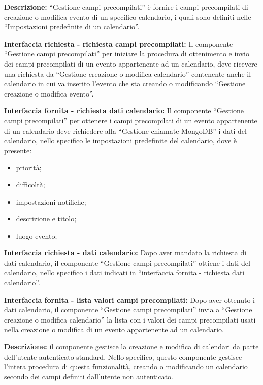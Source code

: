 \begin{listaPersonale}[]{}

    \textbf{Descrizione:}  “Gestione campi precompilati” è fornire i campi precompilati di creazione o modifica evento di un specifico calendario, i quali sono definiti nelle “Impostazioni predefinite di un calendario”.

    \textbf{Interfaccia richiesta - richiesta campi precompilati:} Il componente “Gestione campi precompilati” per iniziare la procedura di ottenimento e invio dei campi precompilati di un evento appartenente ad un calendario, deve ricevere una richiesta da “Gestione creazione o modifica calendario” contenente anche il calendario in cui va inserito l'evento che sta creando o modificando “Gestione creazione o modifica evento”.

    \textbf{Interfaccia fornita - richiesta dati calendario:} Il componente “Gestione campi precompilati” per ottenere i campi precompilati di un evento appartenente di un calendario deve richiedere alla “Gestione chiamate MongoDB” i dati del calendario, nello specifico le impostazioni predefinite del calendario, dove è presente:
    \begin{itemize}
        \item priorità;
        \item difficoltà;
        \item impostazioni notifiche;
        \item descrizione e titolo;
        \item luogo evento;
    \end{itemize}

    \textbf{Interfaccia richiesta - dati calendario:} Dopo aver mandato la richiesta di dati calendario, il componente “Gestione campi precompilati” ottiene i dati del calendario, nello specifico i dati indicati in “interfaccia fornita - richiesta dati calendario”.

    \textbf{Interfaccia fornita - lista valori campi precompilati:} Dopo aver ottenuto i dati calendario, il componente “Gestione campi precompilati” invia a “Gestione creazione o modifica calendario” la lista con i valori dei campi precompilati usati nella creazione o modifica di un evento appartenente ad un calendario.



    \textbf{Descrizione:} il componente gestisce la creazione e modifica di calendari da parte dell'utente autenticato standard. Nello specifico, questo componente gestisce l'intera procedura di questa funzionalità, creando o modificando un calendario secondo dei campi definiti dall'utente non autenticato.


\end{listaPersonale}
